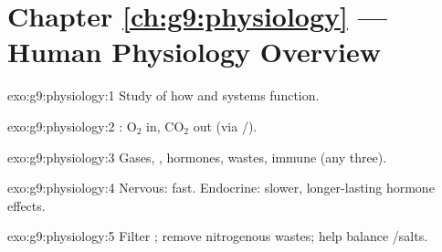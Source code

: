 \section*{Chapter \ref{ch:g9:physiology} --- Human Physiology Overview}

\begin{solution}{exo:g9:physiology:1}
Study of how  and systems function.
\end{solution}

\begin{solution}{exo:g9:physiology:2}
: $\mathrm{O_2}$ in, $\mathrm{CO_2}$ out (via /).
\end{solution}

\begin{solution}{exo:g9:physiology:3}
Gases, , hormones, wastes, immune  (any three).
\end{solution}

\begin{solution}{exo:g9:physiology:4}
Nervous: fast. Endocrine: slower, longer-lasting hormone effects.
\end{solution}

\begin{solution}{exo:g9:physiology:5}
Filter ; remove nitrogenous wastes; help balance /salts.
\end{solution}

